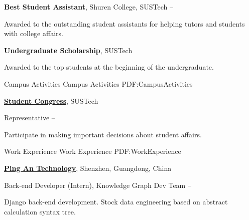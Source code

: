 \documentclass[a4paper,MMMyyyy,nonstopmode]{simpleresumecv}
\begin{document}
\begin{Body}
    \BulletItem
    \textbf{Best Student Assistant},
    Shuren College,
    SUSTech
    \hfill
     --
    \begin{Detail}
        \Item
        Awarded to the outstanding student assistants for helping tutors and students with college affairs.
    \end{Detail}

    \Gap
    \BulletItem
    \textbf{Undergraduate Scholarship},
    SUSTech
    \hfill
    \begin{Detail}
        \Item
        Awarded to the top students at the beginning of the undergraduate.
    \end{Detail}




    \Section
    {Campus Activities}
    {Campus Activities}
    {PDF:CampusActivities}

    \Entry
    \href{https://www.sustech.edu.cn/en/campus-life.html?lang=en}
    {\textbf{Student Congress}},
    SUSTech

    \Gap
    \BulletItem
    Representative
    \hfill
     --
    \begin{Detail}
        \SubBulletItem
        Participate in making important decisions about student affairs.
    \end{Detail}


    \Section
    {Work\newline
        Experience}
    {Work Experience}
    {PDF:WorkExperience}

    \Entry
    \href{https://tech.pingan.com/}
    {\textbf{Ping An Technology}},
    Shenzhen, Guangdong, China

    \Gap
    \BulletItem
    Back-end Developer (Intern),
    Knowledge Graph Dev Team
    \hfill
     --
    \begin{Detail}
        \SubBulletItem
        Django back-end development.
        \SubBulletItem
        Stock data engineering based on abstract calculation syntax tree.
    \end{Detail}


\end{Body}
\end{document}
